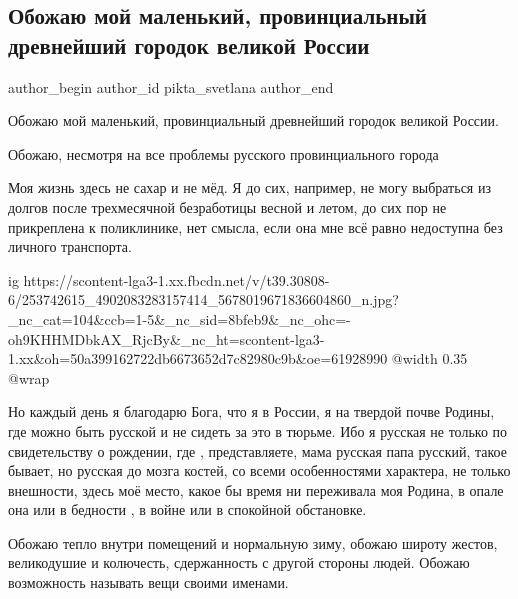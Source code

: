  
 
 
 
 
 
\subsection{Обожаю мой маленький, провинциальный древнейший городок великой России}
\label{sec:10_11_2021.fb.pikta_svetlana.1.obozhaju_jaroslavl}
 
\ifcmt
 author_begin
   author_id pikta_svetlana
 author_end
\fi

Обожаю мой маленький, провинциальный древнейший городок великой России. 

Обожаю, несмотря на все проблемы русского провинциального города

Моя жизнь здесь не сахар и не мёд. Я до сих, например, не могу выбраться из
долгов после трехмесячной безработицы весной и летом, до сих пор не прикреплена
к поликлинике, нет смысла, если она мне всё равно недоступна без личного
транспорта. 

\ifcmt
  ig https://scontent-lga3-1.xx.fbcdn.net/v/t39.30808-6/253742615_4902083283157414_5678019671836604860_n.jpg?_nc_cat=104&ccb=1-5&_nc_sid=8bfeb9&_nc_ohc=-oh9KHHMDbkAX_RjcBy&_nc_ht=scontent-lga3-1.xx&oh=50a399162722db6673652d7c82980c9b&oe=61928990
  @width 0.35
  @wrap 
\fi

Но каждый день я благодарю Бога, что я в России, я на твердой почве Родины, где
можно быть русской и не сидеть за это в тюрьме. Ибо я русская не только по
свидетельству о рождении, где , представляете, мама русская папа русский, такое
бывает, но русская до мозга костей, со всеми особенностями характера, не только
внешности, здесь моё место, какое бы время ни переживала моя Родина, в опале
она или в бедности , в войне или в спокойной обстановке.

Обожаю тепло внутри помещений и нормальную зиму, обожаю широту жестов,
великодушие и колючесть, сдержанность с другой стороны людей. Обожаю
возможность называть вещи своими именами.

